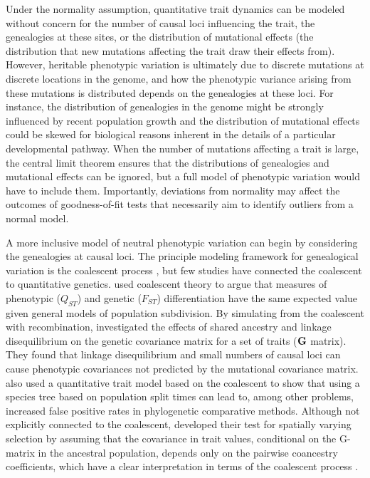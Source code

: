 Under the normality assumption, quantitative trait dynamics can be modeled
without concern for the number of causal loci influencing the trait, the
genealogies at these sites, or the distribution of mutational effects (the
distribution that new mutations affecting the trait draw their effects from).
However, heritable phenotypic variation is ultimately due to discrete mutations
at discrete locations in the genome, and how the phenotypic variance arising
from these mutations is distributed depends on the genealogies at these loci.
For instance, the distribution of genealogies in the genome might be strongly
influenced by recent population growth and the distribution of mutational
effects could be skewed for biological reasons inherent in the details of a
particular developmental pathway. When the number of mutations affecting a trait
is large, the central limit theorem ensures that the distributions of
genealogies and mutational effects can be ignored, but a full model of
phenotypic variation would have to include them. Importantly, deviations from
normality may affect the outcomes of goodness-of-fit tests that necessarily aim
to identify outliers from a normal model.

A more inclusive model of neutral phenotypic variation can begin by considering
the genealogies at causal loci. The principle modeling framework for
genealogical variation is the coalescent process \citep{Wakeley2008}, but few
studies have connected the coalescent to quantitative
genetics. \citet{Whitlock1999} used coalescent theory to argue that measures of
phenotypic ($Q_{ST}$) and genetic ($F_{ST}$) differentiation have the same
expected value given general models of population subdivision. By simulating
from the coalescent with recombination,
\citet{Griswold2007} investigated the effects of shared ancestry and linkage
disequilibrium on the genetic covariance matrix for a set of traits
($\mbox{\textbf{G}}$ matrix). They found that linkage disequilibrium and small
numbers of causal loci can cause phenotypic covariances not predicted by the
mutational covariance matrix. \citet{Mendes2018} also used a quantitative trait
model based on the coalescent to show that using a species tree based on
population split times can lead to, among other problems, increased false
positive rates in phylogenetic comparative methods. Although not explicitly
connected to the coalescent, \citet{Ovaskainen2011} developed their test for
spatially varying selection by assuming that the covariance in trait values,
conditional on the G-matrix in the ancestral population, depends only on the
pairwise coancestry coefficients, which have a clear interpretation in terms of
the coalescent process \citep{Slatkin1991}.

